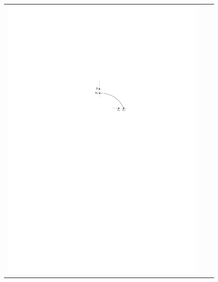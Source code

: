 \documentclass{jgaa-art}
\begin{document}
\begin{figure}
\begin{center}
\begin{tabular}{ccc}
       \includegraphics{figs/silly-2} &

\end{tabular}
\end{center}
\end{figure}
\end{document}
